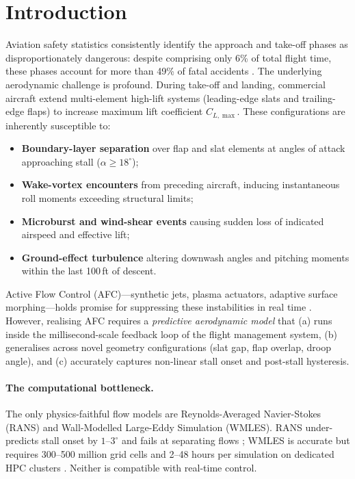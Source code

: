 \documentclass[10pt,twocolumn,letterpaper]{article}
\begin{document}
\section{Introduction}
\label{sec:intro}

Aviation safety statistics consistently identify the approach and
take-off phases as disproportionately dangerous: despite comprising
only 6\% of total flight time, these phases account for more than
49\% of fatal accidents \cite{BoeingSR2023}. The underlying
aerodynamic challenge is profound. During take-off and landing,
commercial aircraft extend multi-element high-lift systems (leading-edge
slats and trailing-edge flaps) to increase maximum lift coefficient
$C_{L,\max}$. These configurations are inherently susceptible to:

\begin{itemize}
  \item \textbf{Boundary-layer separation} over flap and slat elements
        at angles of attack approaching stall ($\alpha \ge 18^\circ$);
  \item \textbf{Wake-vortex encounters} from preceding aircraft,
        inducing instantaneous roll moments exceeding structural limits;
  \item \textbf{Microburst and wind-shear events} causing sudden loss
        of indicated airspeed and effective lift;
  \item \textbf{Ground-effect turbulence} altering downwash angles and
        pitching moments within the last 100\,ft of descent.
\end{itemize}

\noindent Active Flow Control (AFC)—synthetic jets, plasma actuators,
adaptive surface morphing—holds promise for suppressing these
instabilities in real time \cite{Cattafesta2011AFC,Greenblatt2000AFC}.
However, realising AFC requires a \emph{predictive aerodynamic model}
that (a) runs inside the millisecond-scale feedback loop of the flight
management system, (b) generalises across novel geometry configurations
(slat gap, flap overlap, droop angle), and (c) accurately captures
non-linear stall onset and post-stall hysteresis.

\paragraph{The computational bottleneck.}
The only physics-faithful flow models are Reynolds-Averaged
Navier-Stokes (RANS) and Wall-Modelled Large-Eddy Simulation (WMLES).
RANS under-predicts stall onset by $1$--$3^\circ$ and fails at
separating flows \cite{Slotnick2014CFDVision}; WMLES is accurate but
requires 300–500 million grid cells and 2–48 hours per simulation on
dedicated HPC clusters \cite{Lozano2022WMLES}. Neither is compatible
with real-time control.
\end{document}

